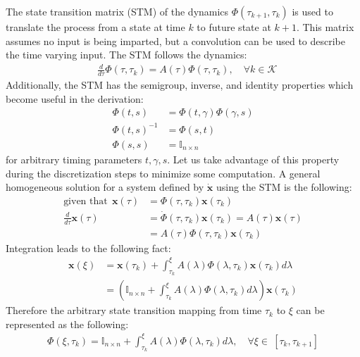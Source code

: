 \documentclass[conf]{new-aiaa}
\begin{document}
The state transition matrix (STM) of the dynamics $\Phi(\tau_{k+1},\tau_k)$ is used to translate the process from a state at time $k$ to future state at $k+1$. This matrix assumes no input is being imparted, but a convolution can be used to describe the time varying input. The STM follows the dynamics:
%
\begin{align}
& \frac{d}{d\tau} \Phi(\tau,\tau_k) = A(\tau) \Phi(\tau,\tau_k), \quad \forall k \in \mathcal{K}
\end{align}
Additionally, the STM has the semigroup, inverse, and identity properties which become useful in the derivation:
\begin{align}
	\Phi(t,s) &= \Phi(t, \gamma)\Phi(\gamma, s) \\
	\Phi(t,s)^{-1} &= \Phi(s,t) \\
	\Phi(s,s) &= \mathbb{I}_{n \times n}
\end{align}
for arbitrary timing parameters $t, \gamma, s$. Let us take advantage of this property during the discretization steps to minimize some computation. A general homogeneous solution for a system defined by $\dot{\mathbf{x}}$ using the STM is the following:
%
\begin{align}
	\text{given that} \ \ \mathbf{x}(\tau) &= \Phi(\tau, \tau_k) \mathbf{x}(\tau_k)\\
	\frac{d}{d\tau}\mathbf{x}(\tau) &= \dot{\Phi}(\tau, \tau_k) \mathbf{x}(\tau_k) = A(\tau)\mathbf{x}(\tau) \\ 
	& = A(\tau) \Phi(\tau, \tau_k) \mathbf{x}(\tau_k)
\end{align}
Integration leads to the following fact:
\begin{align}
	\mathbf{x}(\xi) &= \mathbf{x}(\tau_k) + \int_{\tau_k}^\xi A(\lambda) \Phi(\lambda, \tau_k) \mathbf{x}(\tau_k) d\lambda \\
	&= \left( \mathbb{I}_{n\times n} + \int_{\tau_k}^\xi A(\lambda) \Phi(\lambda, \tau_k) d\lambda \right)  \mathbf{x}(\tau_k)
\end{align}
Therefore the arbitrary state transition mapping from time $\tau_k$ to $\xi$ can be represented as the following:
\begin{align}
	\Phi(\xi, \tau_k) = \mathbb{I}_{n\times n} + \int_{\tau_k}^\xi A(\lambda) \Phi(\lambda, \tau_k) d\lambda, \quad \forall \xi \in \ [\tau_k, \tau_{k+1}]
\end{align}
\end{document}
